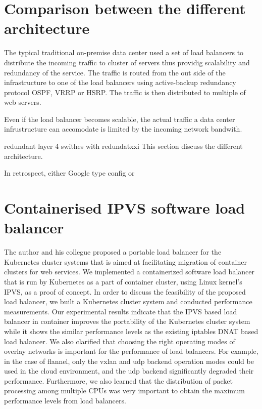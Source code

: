 \section{Comparison between the different architecture}\label{Routing}
The typical traditional on-premise data center used a set of load balancers to distribute the incoming traffic to cluster of servers thus providig scalability and redundancy of the service.
The traffic is routed from the out side of the infrastructure to one of the load balancers using active-backup redundancy protocol OSPF, VRRP or HSRP.
The traffic is then distributed to multiple of web servers.




Even if the load balancer becomes scalable, the actual traffic a data center infrustructure can accomodate is limited by the incoming network bandwith.

redundant layer 4 swithes with redundatxxi
This section discuss the different architecture.

In retrospect,  either Google type config or 

\section{Containerised IPVS software load balancer}\label{IPVS}


The author and his collegue proposed a portable load balancer for the Kubernetes cluster systems 
that is aimed at facilitating migration of container clusters for web services.
We implemented a containerized software load balancer that is run by Kubernetes as a part of container cluster, 
using Linux kernel's IPVS, as a proof of concept.
In order to discuss the feasibility of the proposed load balancer, we built 
a Kubernetes cluster system and conducted performance measurements.
Our experimental results indicate that the IPVS based load balancer in container improves the portability of 
the Kubernetes cluster system while it shows the similar performance levels as the existing iptables DNAT based load balancer.
We also clarified that choosing the right operating modes of overlay networks is important for the performance of load balancers. 
For example, in the case of flannel, only the vxlan and udp backend operation modes could be used 
in the cloud environment, and the udp backend significantly degraded their performance.
Furthermore, we also learned that the distribution of packet processing among multiple CPUs was very important
to obtain the maximum performance levels from load balancers.
%

